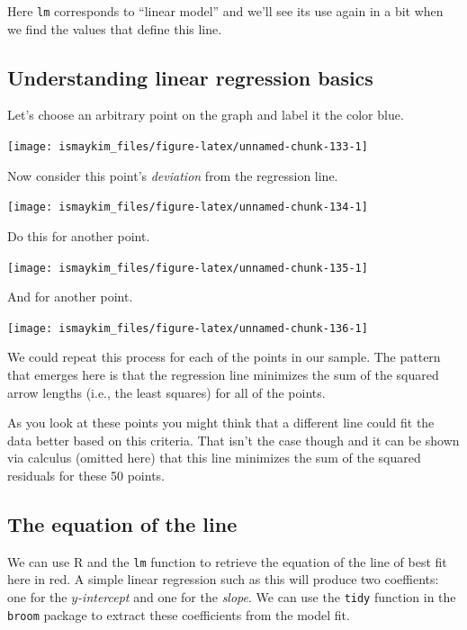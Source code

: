 \documentclass[]{tufte-book}
\begin{document}
Here \texttt{lm} corresponds to ``linear model'' and we'll see its use
again in a bit when we find the values that define this line.

\subsection{Understanding linear regression
basics}\label{understanding-linear-regression-basics}

Let's choose an arbitrary point on the graph and label it the color
blue.

\begin{center}\texttt{[image: ismaykim\_files/figure-latex/unnamed-chunk-133-1]} \end{center}

Now consider this point's \emph{deviation} from the regression line.

\begin{center}\texttt{[image: ismaykim\_files/figure-latex/unnamed-chunk-134-1]} \end{center}

Do this for another point.

\begin{center}\texttt{[image: ismaykim\_files/figure-latex/unnamed-chunk-135-1]} \end{center}

And for another point.

\begin{center}\texttt{[image: ismaykim\_files/figure-latex/unnamed-chunk-136-1]} \end{center}

We could repeat this process for each of the points in our sample. The
pattern that emerges here is that the regression line minimizes the sum
of the squared arrow lengths (i.e., the least squares) for all of the
points.

As you look at these points you might think that a different line could
fit the data better based on this criteria. That isn't the case though
and it can be shown via calculus (omitted here) that this line minimizes
the sum of the squared residuals for these 50 points.

\subsection{The equation of the line}\label{the-equation-of-the-line}

We can use R and the \texttt{lm} function to retrieve the equation of
the line of best fit here in red. A simple linear regression such as
this will produce two coeffients: one for the \emph{\(y\)-intercept} and
one for the \emph{slope}. We can use the \texttt{tidy} function in the
\texttt{broom} package to extract these coefficients from the model fit.
\end{document}
